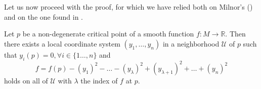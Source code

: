 Let us now proceed with the proof, for which we have relied both on Milnor's (\cite[p.~6]{milnor1963}) and on the one found in \cite[p.~431]{marsdenHoffman1993eca}.

\begin{lemma}\label{lemamorse}
    Let $p$ be a non-degenerate critical point of a smooth function $f:M\to \mathbb{R}$. Then there exists a local coordinate system $(y_1,\dots, y_n)$ in a neighborhood $\mathcal{U}$ of $p$ such that $y_i(p)=0, \forall i\in \{1\dots,n\}$ and
    \begin{equation*}
        f=f(p)-(y_1)^2-\dots-(y_\lambda)^2 + (y_{\lambda +1})^2+\dots + (y_n)^2
    \end{equation*}
    holds on all of $\mathcal{U}$ with $\lambda$ the index of $f$ at $p$.
\end{lemma}
\bigskip

